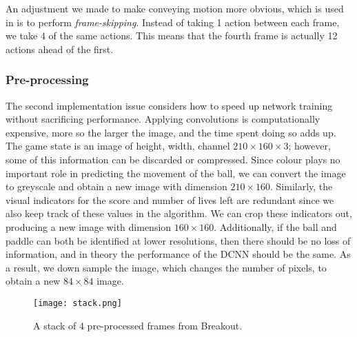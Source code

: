 \documentclass[12pt,a4paper]{article}
\begin{document}
An adjustment we made to make conveying motion more obvious, which is used in \cite{Mnih2015} is to perform \emph{frame-skipping}. Instead of taking 1 action between each frame, we take 4 of the same actions. This means that the fourth frame is actually 12 actions ahead of the first. 

\subsubsection{Pre-processing}
The second implementation issue considers how to speed up network training without sacrificing performance. Applying convolutions is computationally expensive, more so the larger the image, and the time spent doing so adds up. The game state is an image of height, width, channel $210 \times 160 \times 3$; however, some of this information can be discarded or compressed. Since colour plays no important role in predicting the movement of the ball, we can convert the image to greyscale and obtain a new image with dimension $210 \times 160$. Similarly, the visual indicators for the score and number of lives left are redundant since we also keep track of these values in the algorithm. We can crop these indicators out, producing a new image with dimension $160 \times 160$. Additionally, if the ball and paddle can both be identified at lower resolutions, then there should be no loss of information, and in theory the performance of the DCNN should be the same. As a result, we down sample the image, which changes the number of pixels, to obtain a new $84 \times 84$ image. 



\begin{figure}[ht]
    \centering
    \texttt{[image: stack.png]}
    \caption{A stack of 4 pre-processed frames from Breakout.}
  \end{figure}
\end{document}
